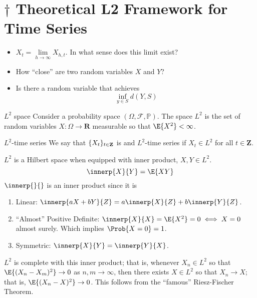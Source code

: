\section{\texorpdfstring{$ \dagger $}{†} Theoretical L2 Framework for Time Series}
\begin{itemize}
    \item $ X_t = \lim\limits_{{h} \to {\infty}} X_{h,t} $. In what sense
          does this limit exist?
    \item How ``close'' are two random variables $ X $ and $ Y $?
    \item Is there a random variable that achieves
          \[ \inf_{y\in S}d(Y,S) \]
\end{itemize}
\begin{Definition}{$ L^2 $ space}{}
    Consider a probability space $ (\Omega,\mathcal{F},\mathbb{P}) $.
    The space $ L^2 $ is the set of random variables
    $ X:\Omega\to\mathbf{R} $ measurable so that $ \E{X^2}<\infty $.
\end{Definition}
\begin{Definition}{$ L^2 $-time series}{}
    We say that $ \{X_t\}_{t\in\mathbf{Z}} $ is
    and $ L^2 $-time series if $ X_t\in L^2 $ for all
    $ t\in\mathbf{Z} $.
\end{Definition}
$ L^2 $ is a Hilbert space when equipped
with inner product, $ X,Y\in L^2 $.
\[ \innerp{X}{Y}=\E{XY} \]
$ \innerp{}{} $ is an inner product since it is
\begin{enumerate}[(1)]
    \item Linear: $ \innerp{aX+bY}{Z}=a\innerp{X}{Z}+b\innerp{Y}{Z} $.
    \item ``Almost'' Positive Definite:
          $ \innerp{X}{X}=\E{X^2}=0 \iff X=0 $ almost surely.
          Which implies $ \Prob{X=0}=1 $.
    \item Symmetric: $ \innerp{X}{Y}=\innerp{Y}{X} $.
\end{enumerate}
$ L^2 $ is complete with this inner product; that is,
whenever $ X_n\in L^2 $ so that $ \E{(X_n-X_m)^2}\to 0 $
as $ n,m\to\infty $, then there exists $ X\in L^2 $
so that $ X_n\to X $; that is, $ \E{(X_n-X)^2}\to 0 $.
This follows from the ``famous'' Riesz-Fischer Theorem.
